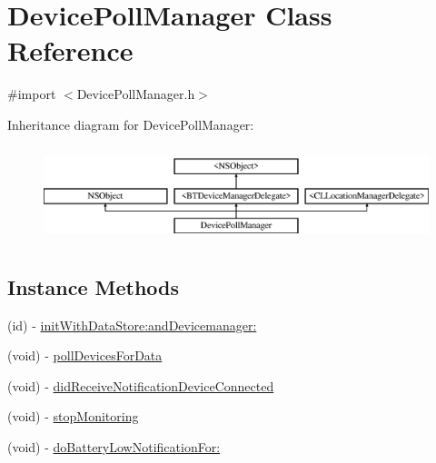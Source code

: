 \hypertarget{interface_device_poll_manager}{\section{Device\-Poll\-Manager Class Reference}
\label{interface_device_poll_manager}
}


{\ttfamily \#import $<$Device\-Poll\-Manager.\-h$>$}

Inheritance diagram for Device\-Poll\-Manager\-:\begin{figure}[H]
\begin{center}
\leavevmode
\includegraphics[height=2.814070cm]{interface_device_poll_manager}
\end{center}
\end{figure}
\subsection*{Instance Methods}
\begin{DoxyCompactItemize}
\item 
(id) -\/ \hyperlink{interface_device_poll_manager_ac1637206b4271575f8b2afd39375125b}{init\-With\-Data\-Store\-:and\-Devicemanager\-:}
\item 
(void) -\/ \hyperlink{interface_device_poll_manager_ac0c31de4251c9eac9b21594cc866f165}{poll\-Devices\-For\-Data}
\item 
(void) -\/ \hyperlink{interface_device_poll_manager_a91b7db2f338c98f0d653e8a33d95b736}{did\-Receive\-Notification\-Device\-Connected}
\item 
(void) -\/ \hyperlink{interface_device_poll_manager_a4fe6160b06d23999e8939c88e900b232}{stop\-Monitoring}
\item 
(void) -\/ \hyperlink{interface_device_poll_manager_aa0e15e54081df4d481de96cde113f2b8}{do\-Battery\-Low\-Notification\-For\-:}
\end{DoxyCompactItemize}
